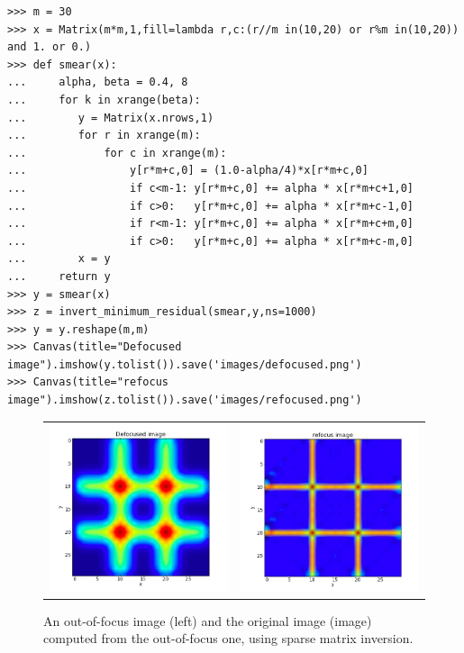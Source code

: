 \documentclass[justified,sixbynine]{tufte-book}
\def\ft{\small\tt}
\theoremstyle{plain}%
\theoremstyle{definition}
\theoremstyle{remark}
\begin{document}
\begin{fullwidth}
\begin{lstlisting}[caption={in file: {\ft nlib.py}}]
>>> m = 30
>>> x = Matrix(m*m,1,fill=lambda r,c:(r//m in(10,20) or r%m in(10,20)) and 1. or 0.)
>>> def smear(x):
...     alpha, beta = 0.4, 8
...     for k in xrange(beta):
...        y = Matrix(x.nrows,1)
...        for r in xrange(m):
...            for c in xrange(m):
...                y[r*m+c,0] = (1.0-alpha/4)*x[r*m+c,0]
...                if c<m-1: y[r*m+c,0] += alpha * x[r*m+c+1,0]
...                if c>0:   y[r*m+c,0] += alpha * x[r*m+c-1,0]
...                if r<m-1: y[r*m+c,0] += alpha * x[r*m+c+m,0]
...                if c>0:   y[r*m+c,0] += alpha * x[r*m+c-m,0]
...        x = y
...     return y
>>> y = smear(x)
>>> z = invert_minimum_residual(smear,y,ns=1000)
>>> y = y.reshape(m,m)
>>> Canvas(title="Defocused image").imshow(y.tolist()).save('images/defocused.png')
>>> Canvas(title="refocus image").imshow(z.tolist()).save('images/refocused.png')
\end{lstlisting}

\begin{figure}[ht]
\centering
\begin{tabular}{cc}
\includegraphics[width=2.2in]{images/defocused.png} &
\includegraphics[width=2.2in]{images/refocused.png}
\end{tabular}
\caption{An out-of-focus image (left) and the original image (image) computed from the out-of-focus one, using sparse matrix inversion.}
\end{figure}


\end{fullwidth}
\end{document}

